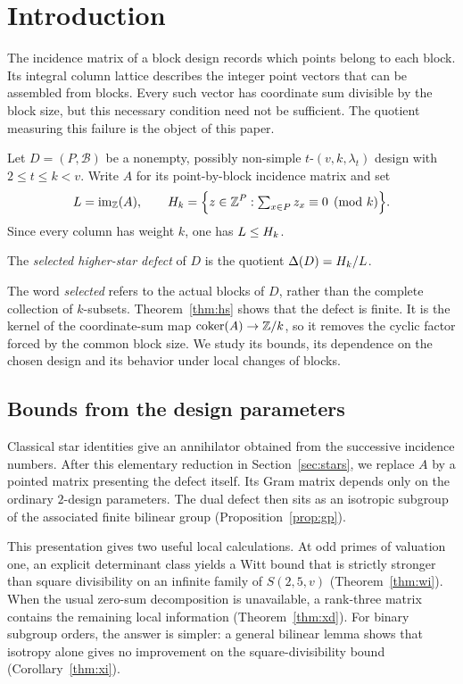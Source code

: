 \section{Introduction}

The incidence matrix of a block design records which points belong to each
block. Its integral column lattice describes the integer point vectors that
can be assembled from blocks. Every such vector has coordinate sum divisible
by the block size, but this necessary condition need not be sufficient.
The quotient measuring this failure is the object of this paper.

Let $D=(P,\mathcal B)$ be a nonempty, possibly non-simple
$t$-$(v,k,\lambda_t)$ design with $2\le t\le k<v$. Write $A$ for its
point-by-block incidence matrix and set
\[
L=\operatorname{im}_{\mathbb{Z}}(A),\qquad
H_k=\Big\{z\in\mathbb{Z}^P:\textstyle\sum_{x\in P}z_x\equiv0\pmod k\Big\}.
\]
Since every column has weight $k$, one has $L\le H_k$.

\begin{definition}
The \emph{selected higher-star defect} of $D$ is the quotient
$\Delta(D)=H_k/L$.
\end{definition}

The word \emph{selected} refers to the actual blocks of $D$, rather than the
complete collection of $k$-subsets. Theorem~\ref{thm:hs} shows that the defect
is finite. It is the kernel of the coordinate-sum map
$\operatorname{coker}(A)\to\mathbb{Z}/k$, so it removes the cyclic factor forced by the common
block size. We study its bounds, its dependence on the chosen design and
its behavior under local changes of blocks.

\subsection{Bounds from the design parameters}

Classical star identities give an annihilator obtained from the successive
incidence numbers. After this elementary reduction in Section~\ref{sec:stars},
we replace $A$ by a pointed matrix presenting the defect itself. Its Gram
matrix depends only on the ordinary $2$-design parameters. The dual defect
then sits as an isotropic subgroup of the associated finite bilinear group
(Proposition~\ref{prop:gp}).

This presentation gives two useful local calculations. At odd primes of
valuation one, an explicit determinant class yields a Witt bound that is
strictly stronger than square divisibility on an infinite family of
$S(2,5,v)$ (Theorem~\ref{thm:wi}). When the usual zero-sum decomposition is
unavailable, a rank-three matrix contains the remaining local information
(Theorem~\ref{thm:xd}). For binary subgroup orders, the answer is simpler:
a general bilinear lemma shows that isotropy alone gives no improvement on
the square-divisibility bound (Corollary~\ref{thm:xi}).

